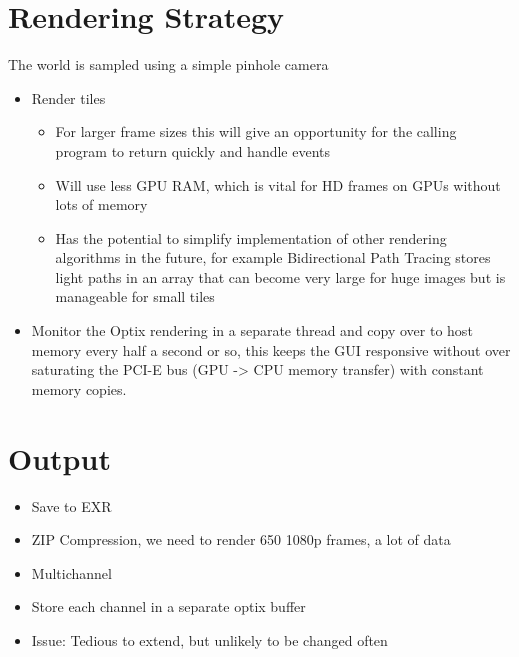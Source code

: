 \documentclass[11pt,a4paper,final,notitlepage]{report}
\begin{document}
\begin{itemize}
\begin{itemize}
		\end{itemize}
\end{itemize}

\section{Rendering Strategy}
The world is sampled using a simple pinhole camera \cite{pinhole}

\begin{itemize}
	\item Render tiles \cite[pp. 51-52]{kalamp}
	\begin{itemize}
		\item For larger frame sizes this will give an opportunity for the calling program to return quickly and handle events
		\item Will use less GPU RAM, which is vital for HD frames on GPUs without lots of memory
		\item Has the potential to simplify implementation of other rendering algorithms in the future, for example Bidirectional Path Tracing stores light paths in an array that can become very large for huge images but is manageable for small tiles
	\end{itemize}

	\item Monitor the Optix rendering in a separate thread and copy over to host memory every half a second or so, this keeps the GUI responsive without over saturating the PCI-E bus (GPU -> CPU memory transfer) with constant memory copies.
	
\end{itemize}

\section{Output}
\begin{itemize}
	\item Save to EXR
	\item ZIP Compression, we need to render 650 1080p frames, a lot of data
	\item Multichannel
	\item Store each channel in a separate optix buffer
	\item Issue: Tedious to extend, but unlikely to be changed often
	
\end{itemize}
\end{document}
